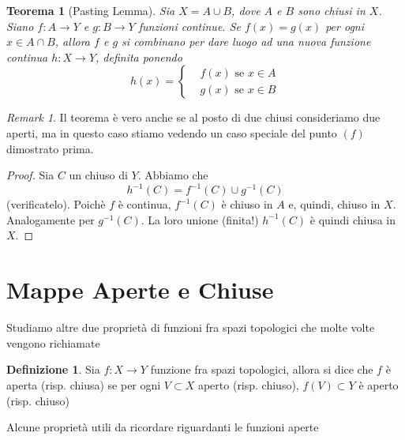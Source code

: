 \documentclass[10pt,a4paper]{article}
\theoremstyle{definition}
\newtheorem{defi}{Definizione}
\theoremstyle{plain}
\newtheorem{teo}{Teorema}
\theoremstyle{remark}
\newtheorem{rem}{Remark}
\theoremstyle{remark}
\begin{document}

\begin{teo}[Pasting Lemma] Sia $X = A \cup B$, dove $A$ e $B$ sono chiusi in $X$. Siano $f : A \to Y$ e $g: B \to Y$ funzioni continue. Se $f(x)=g(x)$ per ogni $x \in A \cap B$, allora $f$ e $g$ si combinano per dare luogo ad una nuova funzione continua $h : X \to Y$, definita ponendo\[ h(x) = \begin{cases} &f(x) \mbox{ se } x \in A \\ &g(x) \mbox{ se } x \in B
\end{cases} \]
\end{teo}

\begin{rem} Il teorema è vero anche se al posto di due chiusi consideriamo due aperti, ma in questo caso stiamo vedendo un caso speciale del punto $(f)$ dimostrato prima. \end{rem}

\begin{proof}
Sia $C$ un chiuso di $Y$. Abbiamo che \[ h^{-1}(C) = f^{-1}(C) \cup g^{-1}(C) \] (verificatelo). Poichè $f$ è continua, $f^{-1}(C)$ è chiuso in $A$ e, quindi, chiuso in $X$. Analogamente per $g^{-1}(C)$. La loro unione (finita!) $h^{-1}(C)$ è quindi chiusa in $X$.
\end{proof}



\section{Mappe Aperte e Chiuse}

Studiamo altre due proprietà di funzioni fra spazi topologici che molte volte vengono richiamate
\begin{defi} Sia $f: X \to Y$ funzione fra spazi topologici, allora si dice che $f$ è aperta (risp. chiusa) se per ogni $V \subset X$ aperto (risp. chiuso), $f(V) \subset Y$ è aperto (risp. chiuso)
 \end{defi}

 Alcune proprietà utili da ricordare riguardanti le funzioni aperte
\end{document}
